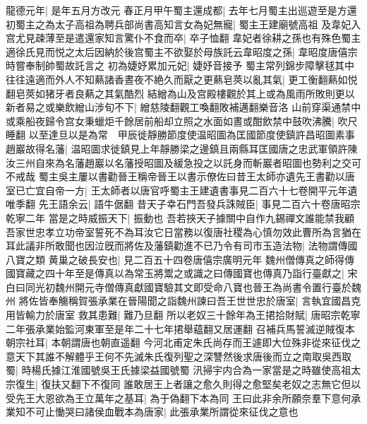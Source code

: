 龍德元年|{
	是年五月方改元}
春正月甲午蜀主還成都|{
	去年七月蜀主出巡遊至是方還}
初蜀主之為太子高祖為聘兵部尚書高知言女為妃無寵|{
	蜀主王建廟號高祖}
及韋妃入宫尤見疎薄至是遣還家知言驚仆不食而卒|{
	卒子恤翻}
韋妃者徐耕之孫也有殊色蜀主適徐氏見而悦之太后因納於後宫蜀主不欲娶於母族託云韋昭度之孫|{
	韋昭度唐僖宗時嘗奉制帥蜀故託言之}
初為婕妤累加元妃|{
	婕妤音接予}
蜀主常列錦步障擊毬其中往往遠適而外人不知爇諸香晝夜不絶久而厭之更爇皂莢以亂其氣|{
	更工衡翻爇如悦翻皂莢如猪牙者良爇之其氣酷烈}
結繒為山及宫殿樓觀於其上或為風雨所敗則更以新者易之或樂飲繒山涉旬不下|{
	繒慈陵翻觀工喚翻敗補邁翻樂音洛}
山前穿渠通禁中或乘船夜歸令宫女秉蠟炬千餘居前船却立照之水面如晝或酣飲禁中鼓吹沸騰|{
	吹尺睡翻}
以至達旦以是為常　甲辰徙靜勝節度使温昭圖為匡國節度使鎮許昌昭圖素事趙巖故得名藩|{
	温昭圖求徙鎮見上年靜勝梁之邊鎮且兩縣耳匡國唐之忠武軍領許陳汝三州自來為名藩趙巖以名藩授昭圖及緩急投之以託身而斬巖者昭圖也勢利之交可不戒哉}
蜀主吳主屢以書勸晉王稱帝晉王以書示僚佐曰昔王太師亦遺先王書勸以唐室已亡宜自帝一方|{
	王太師者以唐官呼蜀主王建遺書事見二百六十七卷開平元年遺唯季翻}
先王語余云|{
	語牛倨翻}
昔天子幸石門吾發兵誅賊臣|{
	事見二百六十卷唐昭宗乾寧二年}
當是之時威振天下|{
	振動也}
吾若挾天子據關中自作九錫禪文誰能禁我顧吾家世忠孝立功帝室誓死不為耳汝它日當務以復唐社稷為心慎勿效此曹所為言猶在耳此議非所敢聞也因泣旣而將佐及藩鎮勸進不已乃令有司市玉造法物|{
	法物謂傳國八寶之類}
黄巢之破長安也|{
	見二百五十四卷唐僖宗廣明元年}
魏州僧傳真之師得傳國寶藏之四十年至是傳真以為常玉將鬻之或識之曰傳國寶也傳真乃詣行臺獻之|{
	宋白曰同光初魏州開元寺僧傳真獻國寶驗其文即受命八寶也晉王為尚書令置行臺於魏州}
將佐皆奉觴稱賀張承業在晉陽聞之詣魏州諫曰吾王世世忠於唐室|{
	言執宜國昌克用皆輸力於唐室}
救其患難|{
	難乃旦翻}
所以老奴三十餘年為王捃拾財賦|{
	唐昭宗乾寧二年張承業始監河東軍至是年二十七年捃舉藴翻又居運翻}
召補兵馬誓滅逆賊復本朝宗社耳|{
	本朝謂唐也朝直遥翻}
今河北甫定朱氏尚存而王遽即大位殊非從來征伐之意天下其誰不解體乎王何不先滅朱氏復列聖之深讐然後求唐後而立之南取吳西取蜀|{
	時楊氏據江淮國號吳王氏據梁益國號蜀}
汛掃宇内合為一家當是之時雖使高祖太宗復生|{
	復扶又翻下不復同}
誰敢居王上者讓之愈久則得之愈堅矣老奴之志無它但以受先王大恩欲為王立萬年之基耳|{
	為于偽翻下本為同}
王曰此非余所願奈羣下意何承業知不可止慟哭曰諸侯血戰本為唐家|{
	此張承業所謂從來征伐之意也}
